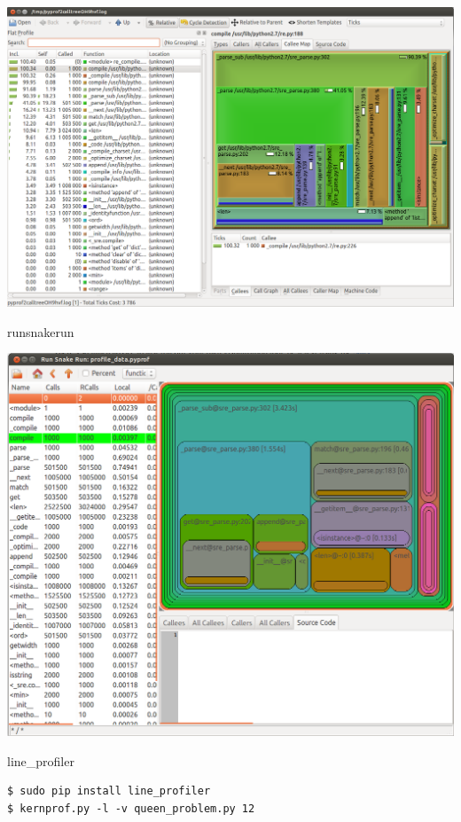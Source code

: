 \documentclass{article}
\begin{document}
\begin{center}\includegraphics[scale=0.35]{images/kcachegrind.png}\end{center}
\newpage

\begin{center} runsnakerun \end{center}
\begin{center}\includegraphics[scale=0.45]{images/runsnake.png}\end{center}
\newpage
\begin{center} line\_profiler \end{center}
\begin{verbatim}
$ sudo pip install line_profiler
$ kernprof.py -l -v queen_problem.py 12
\end{verbatim}
\end{document}
